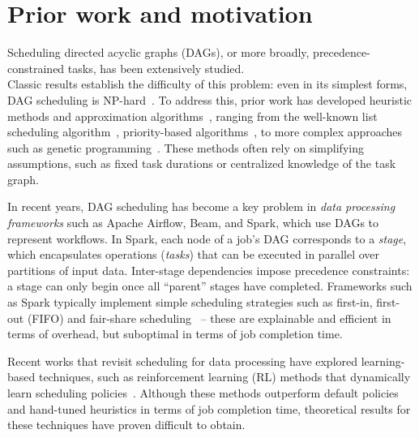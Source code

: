 \section{Prior work and motivation}
\label{sec:motiv}

Scheduling directed acyclic graphs (DAGs), or more broadly, precedence-constrained tasks, has been extensively studied.\\ 
Classic results establish the difficulty of this problem: even in its simplest forms, DAG scheduling is NP-hard~\cite{Lenstra:78}. 
To address this, prior work has developed heuristic methods and approximation algorithms~\cite{Su:24:Tompecs, Chudak:99, Lassota:23, Li:17, Davies:20, Davies:21, Maiti:20, Su:23}, ranging from the well-known list scheduling algorithm~\cite{Graham:66}, priority-based algorithms~\cite{Sels:12:Priority}, to more complex approaches such as genetic programming~\cite{Cheng:96:Genetic, Pezzella:08:Genetic, Davis:14:Genetic}. These methods often rely on simplifying assumptions, such as fixed task durations or centralized knowledge of the task graph.  %


In recent years, DAG scheduling has become %
a key problem in \textit{data processing frameworks} such as Apache Airflow, Beam, and Spark, which use DAGs to represent workflows. 
In Spark, each node of a job's DAG corresponds to a \textit{stage}, which encapsulates operations (\textit{tasks}) that can be executed in parallel over partitions of input data. Inter-stage dependencies impose precedence constraints: a stage can only begin once all ``parent'' stages have completed. 
Frameworks such as Spark typically implement simple scheduling strategies such as first-in, first-out (FIFO) and fair-share scheduling~\cite{SparkScheduling} -- these are explainable and efficient in terms of overhead, but suboptimal in terms of job completion time.

Recent works that revisit scheduling %
for data processing have explored %
learning-based techniques, such as reinforcement learning (RL) methods that dynamically learn scheduling policies~\cite{Hongzi:2019:Decima, Wu:18, Li:23, Grinsztajn:20, Zhou:22, Islam:21}.  Although these methods outperform default policies and hand-tuned heuristics in terms of job completion time, theoretical results for these techniques have proven difficult to obtain.



